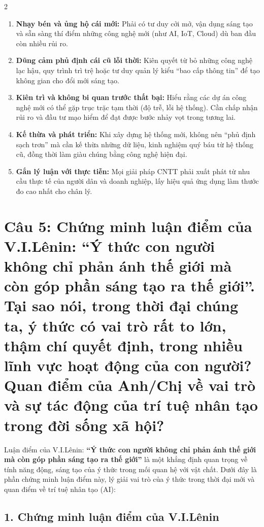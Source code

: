 \documentclass[9pt,a4paper]{extarticle}
\begin{document}
\begin{multicols*}{2}
\begin{enumerate}
\item \textbf{Nhạy bén và ủng hộ cái mới:} Phải có tư duy cởi mở, vận dụng sáng tạo và sẵn sàng thí điểm những công nghệ mới (như AI, IoT, Cloud) dù ban đầu còn nhiều rủi ro.
\item \textbf{Dũng cảm phủ định cái cũ lỗi thời:} Kiên quyết từ bỏ những công nghệ lạc hậu, quy trình trì trệ hoặc tư duy quản lý kiểu ``bao cấp thông tin'' để tạo không gian cho đổi mới sáng tạo.
\item \textbf{Kiên trì và không bi quan trước thất bại:} Hiểu rằng các dự án công nghệ mới có thể gặp trục trặc tạm thời (độ trễ, lỗi hệ thống). Cần chấp nhận rủi ro và đầu tư mạo hiểm để đạt được bước nhảy vọt trong tương lai.
\item \textbf{Kế thừa và phát triển:} Khi xây dựng hệ thống mới, không nên ``phủ định sạch trơn'' mà cần kế thừa những dữ liệu, kinh nghiệm quý báu từ hệ thống cũ, đồng thời làm giàu chúng bằng công nghệ hiện đại.
\item \textbf{Gắn lý luận với thực tiễn:} Mọi giải pháp CNTT phải xuất phát từ nhu cầu thực tế của người dân và doanh nghiệp, lấy hiệu quả ứng dụng làm thước đo cao nhất cho chân lý.
\end{enumerate}

\section*{Câu 5: Chứng minh luận điểm của V.I.Lênin: ``Ý thức con người không chỉ phản ánh thế giới mà còn góp phần sáng tạo ra thế giới''. Tại sao nói, trong thời đại chúng ta, ý thức có vai trò rất to lớn, thậm chí quyết định, trong nhiều lĩnh vực hoạt động của con người? Quan điểm của Anh/Chị về vai trò và sự tác động của trí tuệ nhân tạo trong đời sống xã hội?}

Luận điểm của V.I.Lênin: \textbf{``Ý thức con người không chỉ phản ánh thế giới mà còn góp phần sáng tạo ra thế giới''} là một khẳng định quan trọng về tính năng động, sáng tạo của ý thức trong mối quan hệ với vật chất. Dưới đây là phần chứng minh luận điểm này, lý giải vai trò của ý thức trong thời đại mới và quan điểm về trí tuệ nhân tạo (AI):

\subsection*{1. Chứng minh luận điểm của V.I.Lênin}


\end{multicols*}
\end{document}
